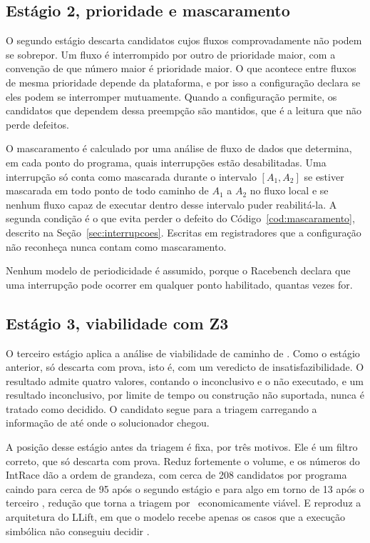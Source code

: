 \subsection{Estágio 2, prioridade e mascaramento}

O segundo estágio descarta candidatos cujos fluxos comprovadamente não podem se
sobrepor. Um fluxo é interrompido por outro de prioridade maior, com a
convenção de que número maior é prioridade maior. O que acontece entre fluxos
de mesma prioridade depende da plataforma, e por isso a configuração declara se
eles podem se interromper mutuamente. Quando a configuração permite, os
candidatos que dependem dessa preempção são mantidos, que é a leitura que não
perde defeitos.

O mascaramento é calculado por uma análise de fluxo de dados que determina, em
cada ponto do programa, quais interrupções estão desabilitadas. Uma interrupção
só conta como mascarada durante o intervalo $[A_1, A_2]$ se estiver mascarada
em todo ponto de todo caminho de $A_1$ a $A_2$ no fluxo local e se nenhum fluxo
capaz de executar dentro desse intervalo puder reabilitá-la. A segunda condição
é o que evita perder o defeito do Código~\ref{cod:mascaramento}, descrito na
Seção~\ref{sec:interrupcoes}. Escritas em registradores que a configuração
não reconheça nunca contam como mascaramento.

Nenhum modelo de periodicidade é assumido, porque o Racebench declara que uma
interrupção pode ocorrer em qualquer ponto habilitado, quantas vezes for.

\subsection{Estágio 3, viabilidade com Z3}

O terceiro estágio aplica a análise de viabilidade de caminho de
. Como o estágio anterior, só descarta com prova, isto é,
com um veredicto de insatisfazibilidade. O resultado admite quatro valores,
contando o inconclusivo e o não executado, e um resultado inconclusivo, por
limite de tempo ou construção não suportada, nunca é tratado como decidido. O
candidato segue para a triagem carregando a informação de até onde o
solucionador chegou.

A posição desse estágio antes da triagem é fixa, por três motivos. Ele é um
filtro correto, que só descarta com prova. Reduz fortemente o volume, e os
números do IntRace dão a ordem de grandeza, com cerca de 208 candidatos por
programa caindo para cerca de 95 após o segundo estágio e para algo em torno de
13 após o terceiro \cite{intrace}, redução que torna a triagem por \llm\
economicamente viável. E reproduz a arquitetura do LLift, em que o modelo
recebe apenas os casos que a execução simbólica não conseguiu decidir
\cite{llift}.

